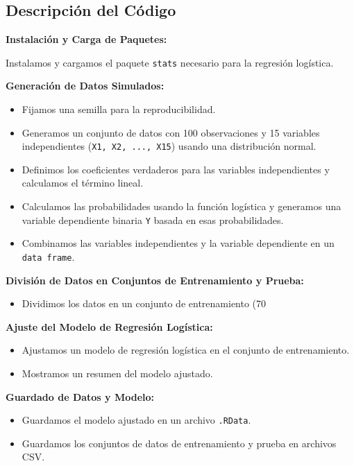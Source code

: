 \subsection*{Descripción del Código}

\textbf{Instalación y Carga de Paquetes:}

Instalamos y cargamos el paquete \texttt{stats} necesario para la regresión logística.

\textbf{Generación de Datos Simulados:}

\begin{itemize}
    \item Fijamos una semilla para la reproducibilidad.
    \item Generamos un conjunto de datos con 100 observaciones y 15 variables independientes (\texttt{X1, X2, ..., X15}) usando una distribución normal.
    \item Definimos los coeficientes verdaderos para las variables independientes y calculamos el término lineal.
    \item Calculamos las probabilidades usando la función logística y generamos una variable dependiente binaria \texttt{Y} basada en esas probabilidades.
    \item Combinamos las variables independientes y la variable dependiente en un \texttt{data frame}.
\end{itemize}

\textbf{División de Datos en Conjuntos de Entrenamiento y Prueba:}

\begin{itemize}
    \item Dividimos los datos en un conjunto de entrenamiento (70%
\end{itemize}

\textbf{Ajuste del Modelo de Regresión Logística:}

\begin{itemize}
    \item Ajustamos un modelo de regresión logística en el conjunto de entrenamiento.
    \item Mostramos un resumen del modelo ajustado.
\end{itemize}

\textbf{Guardado de Datos y Modelo:}

\begin{itemize}
    \item Guardamos el modelo ajustado en un archivo \texttt{.RData}.
    \item Guardamos los conjuntos de datos de entrenamiento y prueba en archivos CSV.
\end{itemize}

